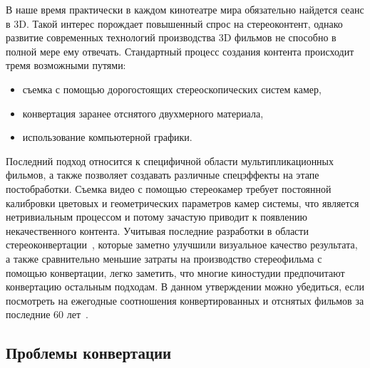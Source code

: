 \documentclass[14pt, a4paper]{extarticle}
\begin{document}
В наше время практически в каждом кинотеатре мира обязательно найдется сеанс в 3D. 
Такой интерес порождает повышенный спрос на стереоконтент, однако развитие 
современных технологий производства 3D фильмов не способно в полной мере ему отвечать. 
Стандартный процесс создания контента происходит тремя возможными путями: 
\begin{itemize}
	\item съемка с помощью дорогостоящих стереоскопических систем камер,
	\item конвертация заранее отснятого двухмерного материала,
	\item использование компьютерной графики.
\end{itemize}
Последний подход относится к специфичной области мультипликационных фильмов, 
а также позволяет создавать различные спецэффекты на этапе постобработки. 
Съемка видео с помощью стереокамер требует постоянной калибровки цветовых и 
геометрических параметров камер системы, что является нетривиальным процессом и 
потому зачастую приводит к появлению некачественного контента.  Учитывая последние разработки 
в области стереоконвертации~\cite{ndjiki2011depth,tolstaya2015depth}, которые 
заметно улучшили визуальное качество результата, а также сравнительно меньшие 
затраты на производство стереофильма с помощью конвертации, 
легко заметить, что многие киностудии предпочитают конвертацию остальным подходам. 
В данном утверждении можно убедиться, если посмотреть на ежегодные соотношения 
конвертированных и отснятых фильмов за последние 60 лет~\cite{realorfake}.

\subsection{Проблемы конвертации} 
\end{document}
